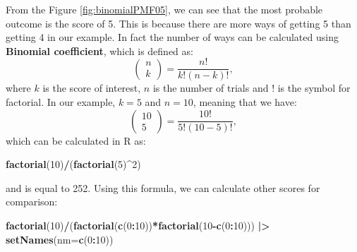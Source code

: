 \documentclass[
]{book}
\newenvironment{Shaded}{\begin{snugshade}}{\end{snugshade}}
\newcommand{\AttributeTok}[1]{\textcolor[rgb]{0.13,0.29,0.53}{#1}}
\newcommand{\DecValTok}[1]{\textcolor[rgb]{0.00,0.00,0.81}{#1}}
\newcommand{\FunctionTok}[1]{\textcolor[rgb]{0.13,0.29,0.53}{\textbf{#1}}}
\newcommand{\NormalTok}[1]{#1}
\newcommand{\SpecialCharTok}[1]{\textcolor[rgb]{0.81,0.36,0.00}{\textbf{#1}}}
\theoremstyle{definition}
\theoremstyle{definition}
\theoremstyle{definition}
\theoremstyle{definition}
\theoremstyle{remark}
\begin{document}
From the Figure \ref{fig:binomialPMF05}, we can see that the most probable outcome is the score of 5. This is because there are more ways of getting 5 than getting 4 in our example. In fact the number of ways can be calculated using \textbf{Binomial coefficient}, which is defined as:
\begin{equation}
    \begin{pmatrix} n \\ k \end{pmatrix} = \frac{n!}{k!(n-k)!},
    \label{eq:BinomialCoefficient}
\end{equation}
where \(k\) is the score of interest, \(n\) is the number of trials and \(!\) is the symbol for factorial. In our example, \(k=5\) and \(n=10\), meaning that we have:
\begin{equation*}
    \begin{pmatrix} 10 \\ 5 \end{pmatrix} = \frac{10!}{5!(10-5)!} ,
\end{equation*}
which can be calculated in R as:

\begin{Shaded}
\begin{Highlighting}[]
\FunctionTok{factorial}\NormalTok{(}\DecValTok{10}\NormalTok{)}\SpecialCharTok{/}\NormalTok{(}\FunctionTok{factorial}\NormalTok{(}\DecValTok{5}\NormalTok{)}\SpecialCharTok{\^{}}\DecValTok{2}\NormalTok{)}
\end{Highlighting}
\end{Shaded}

and is equal to 252. Using this formula, we can calculate other scores for comparison:

\begin{Shaded}
\begin{Highlighting}[]
\FunctionTok{factorial}\NormalTok{(}\DecValTok{10}\NormalTok{)}\SpecialCharTok{/}\NormalTok{(}\FunctionTok{factorial}\NormalTok{(}\FunctionTok{c}\NormalTok{(}\DecValTok{0}\SpecialCharTok{:}\DecValTok{10}\NormalTok{))}\SpecialCharTok{*}\FunctionTok{factorial}\NormalTok{(}\DecValTok{10}\SpecialCharTok{{-}}\FunctionTok{c}\NormalTok{(}\DecValTok{0}\SpecialCharTok{:}\DecValTok{10}\NormalTok{))) }\SpecialCharTok{|\textgreater{}}
    \FunctionTok{setNames}\NormalTok{(}\AttributeTok{nm=}\FunctionTok{c}\NormalTok{(}\DecValTok{0}\SpecialCharTok{:}\DecValTok{10}\NormalTok{))}
\end{Highlighting}
\end{Shaded}
\end{document}
